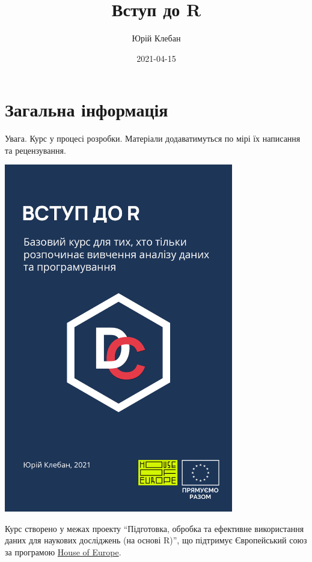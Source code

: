 \documentclass[
]{book}
\title{Вступ до R}
\author{Юрій Клебан}
\date{2021-04-15}
\begin{document}
\maketitle

{
\setcounter{tocdepth}{1}
\tableofcontents
}
\hypertarget{ux437ux430ux433ux430ux43bux44cux43dux430-ux456ux43dux444ux43eux440ux43cux430ux446ux456ux44f}{%
\chapter*{Загальна інформація}\label{ux437ux430ux433ux430ux43bux44cux43dux430-ux456ux43dux444ux43eux440ux43cux430ux446ux456ux44f}}

Увага. Курс у процесі розробки. Матеріали додаватимуться по мірі їх написання та рецензування.

\includegraphics[width=0.75\textwidth,height=\textheight]{images/cover.png}

Курс створено у межах проекту ``Підготовка, обробка та ефективне використання даних для наукових досліджень (на основі R)'', що підтримує Європейський союз за програмою \href{https://houseofeurope.org.ua/}{House of Europe}.
\end{document}
